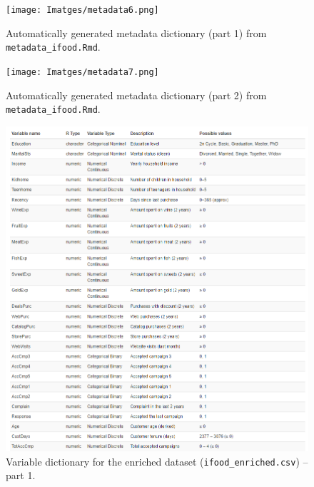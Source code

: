 \begin{figure}[H]
    \centering
    \texttt{[image: Imatges/metadata6.png]}
    \caption{Automatically generated metadata dictionary (part 1) from \texttt{metadata\_ifood.Rmd}.}
    \label{fig:metadata1}
\end{figure}

\begin{figure}[H]
    \centering
    \texttt{[image: Imatges/metadata7.png]}
    \caption{Automatically generated metadata dictionary (part 2) from \texttt{metadata\_ifood.Rmd}.}
    \label{fig:metadata2}
\end{figure}

\begin{figure}[H]
    \centering
    \includegraphics[width=\textwidth]{Imatges/metadata_enriched1.png}
    \caption{Variable dictionary for the enriched dataset (\texttt{ifood\_enriched.csv}) – part 1.}
    \label{fig:metadata_enriched_1}
\end{figure}

